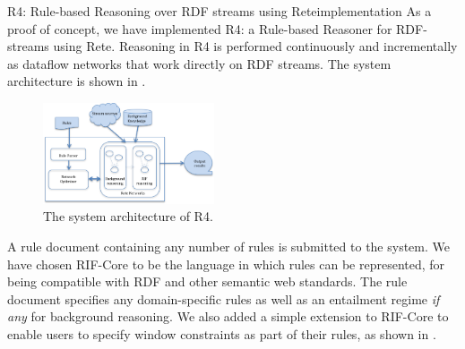 \begin{nestedsection}{R4: Rule-based Reasoning over RDF streams using Rete}{implementation}
	As a proof of concept, we have implemented R4: a Rule-based Reasoner for RDF-streams using Rete.
	Reasoning in R4 is performed continuously and incrementally as dataflow networks that work directly on RDF streams.
	The system architecture is shown in .
	\begin{figure}[b]
		\centering
		\includegraphics[width=0.45\textwidth]{R4-architecture}
		\caption{The system architecture of R4.}
	\end{figure}

	A rule document containing any number of rules is submitted to the system.
	We have chosen RIF-Core to be the language in which rules can be represented, for being compatible with RDF and other semantic web standards.
	The rule document specifies any domain-specific rules as well as an entailment regime \emph{if any} for background reasoning.
	We also added a simple extension to RIF-Core to enable users to specify window constraints as part of their rules, as shown in .


\end{nestedsection}
